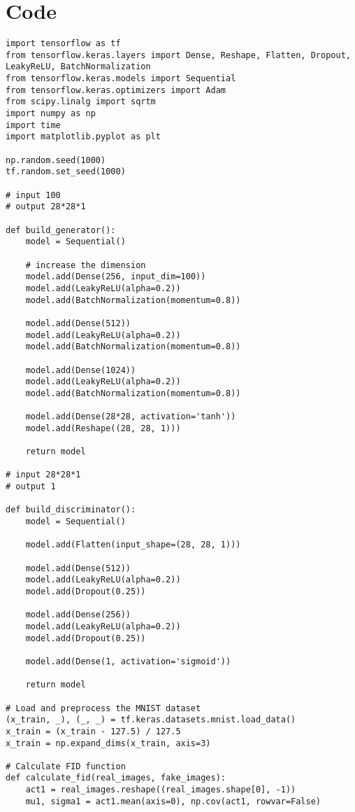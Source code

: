 \chapter{Code}
\label{Code}

\begin{lstlisting}[style=mypython, caption=GAN model with dense layers]
import tensorflow as tf
from tensorflow.keras.layers import Dense, Reshape, Flatten, Dropout, LeakyReLU, BatchNormalization
from tensorflow.keras.models import Sequential
from tensorflow.keras.optimizers import Adam
from scipy.linalg import sqrtm
import numpy as np
import time
import matplotlib.pyplot as plt

np.random.seed(1000)
tf.random.set_seed(1000)

# input 100
# output 28*28*1

def build_generator():
    model = Sequential()
    
    # increase the dimension
    model.add(Dense(256, input_dim=100))
    model.add(LeakyReLU(alpha=0.2))
    model.add(BatchNormalization(momentum=0.8))
    
    model.add(Dense(512))
    model.add(LeakyReLU(alpha=0.2))
    model.add(BatchNormalization(momentum=0.8))
    
    model.add(Dense(1024))
    model.add(LeakyReLU(alpha=0.2))
    model.add(BatchNormalization(momentum=0.8))
    
    model.add(Dense(28*28, activation='tanh'))
    model.add(Reshape((28, 28, 1)))

    return model

# input 28*28*1
# output 1

def build_discriminator():
    model = Sequential()
    
    model.add(Flatten(input_shape=(28, 28, 1)))
    
    model.add(Dense(512))
    model.add(LeakyReLU(alpha=0.2))
    model.add(Dropout(0.25))
    
    model.add(Dense(256))
    model.add(LeakyReLU(alpha=0.2))
    model.add(Dropout(0.25))
    
    model.add(Dense(1, activation='sigmoid'))

    return model

# Load and preprocess the MNIST dataset
(x_train, _), (_, _) = tf.keras.datasets.mnist.load_data()
x_train = (x_train - 127.5) / 127.5
x_train = np.expand_dims(x_train, axis=3)

# Calculate FID function
def calculate_fid(real_images, fake_images):
    act1 = real_images.reshape((real_images.shape[0], -1))
    mu1, sigma1 = act1.mean(axis=0), np.cov(act1, rowvar=False)
    

\end{lstlisting}
